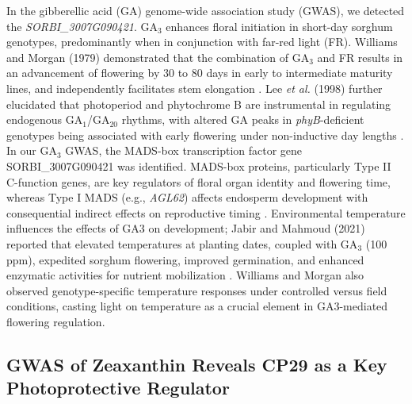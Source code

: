 \documentclass[10pt,letterpaper]{article}
\begin{document}
In the gibberellic acid (GA) genome-wide association study (GWAS), we detected the \textit{SORBI\_3007G090421}. GA\(_3\) enhances floral initiation in short-day sorghum genotypes, predominantly when in conjunction with far-red light (FR). Williams and Morgan (1979) demonstrated that the combination of GA\(_3\) and FR results in an advancement of flowering by 30 to 80 days in early to intermediate maturity lines, and independently facilitates stem elongation \citep{Williams1979}. Lee \emph{et al.} (1998) further elucidated that photoperiod and phytochrome B are instrumental in regulating endogenous GA\(_1\)/GA\(_{20}\) rhythms, with altered GA peaks in \emph{phyB}-deficient genotypes being associated with early flowering under non-inductive day lengths \citep{Lee1998}. In our GA\(_3\) GWAS, the MADS-box transcription factor gene SORBI\_3007G090421 was identified. MADS-box proteins, particularly Type II C-function genes, are key regulators of floral organ identity and flowering time, whereas Type I MADS (e.g., \emph{AGL62}) affects endosperm development with consequential indirect effects on reproductive timing \citep{Paul2020}. Environmental temperature influences the effects of GA3 on development; Jabir and Mahmoud (2021) reported that elevated temperatures at planting dates, coupled with GA\(_3\) (100 ppm), expedited sorghum flowering, improved germination, and enhanced enzymatic activities for nutrient mobilization \citep{Jabir2021}. Williams and Morgan also observed genotype-specific temperature responses under controlled versus field conditions, casting light on temperature as a crucial element in GA3-mediated flowering regulation.


\subsection*{GWAS of Zeaxanthin Reveals CP29 as a Key Photoprotective Regulator}
\end{document}
